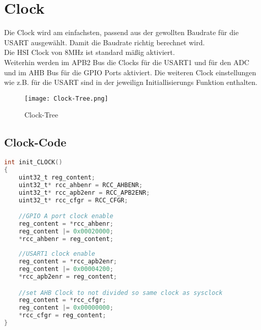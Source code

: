 \newpage
\section{Clock}
    Die Clock wird am einfachsten, passend aus der gewollten Baudrate für die USART ausgewählt. Damit die Baudrate richtig berechnet wird.\\
    Die HSI Clock von 8MHz ist standard mäßig aktiviert.\\
    Weiterhin werden im APB2 Bus die Clocks für die USART1 und für den ADC und im AHB Bus für die GPIO Ports aktiviert. 
    Die weiteren Clock einstellungen wie z.B. für die USART sind in der jeweilign Initiallisierungs Funktion enthalten.
    
    \begin{figure}[!htb]
        \centering
        \texttt{[image: Clock-Tree.png]}
        \caption{Clock-Tree}
        \label{caption:Clock-Tree}
    \end{figure}
    
    
\newpage
\subsection{Clock-Code}
\begin{lstlisting}[language=C, style=CStyle, caption=init-CLOCK, captionpos=b, label=init-CLOCK]
int init_CLOCK()
{
    uint32_t reg_content;
    uint32_t* rcc_ahbenr = RCC_AHBENR; 
    uint32_t* rcc_apb2enr = RCC_APB2ENR;
    uint32_t* rcc_cfgr = RCC_CFGR;

    //GPIO A port clock enable
    reg_content = *rcc_ahbenr;
    reg_content |= 0x00020000;
    *rcc_ahbenr = reg_content;
    
    //USART1 clock enable
    reg_content = *rcc_apb2enr;
    reg_content |= 0x00004200;
    *rcc_apb2enr = reg_content;

    //set AHB Clock to not divided so same clock as sysclock
    reg_content = *rcc_cfgr;
    reg_content |= 0x00000000;
    *rcc_cfgr = reg_content; 
}
\end{lstlisting}